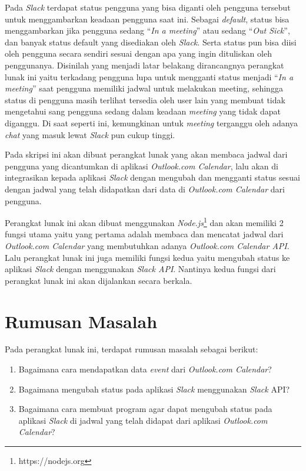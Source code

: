 Pada \textit{Slack} terdapat status pengguna yang bisa diganti oleh pengguna tersebut untuk menggambarkan keadaan pengguna saat ini. Sebagai \textit{default}, status bisa menggambarkan jika pengguna sedang ``\textit{In a meeting}'' atau sedang ``\textit{Out Sick}'', dan banyak status default yang disediakan oleh \textit{Slack}. Serta status pun bisa diisi oleh pengguna secara sendiri sesuai dengan apa yang ingin dituliskan oleh penggunanya. Disinilah yang menjadi latar belakang dirancangnya perangkat lunak ini yaitu terkadang pengguna lupa untuk mengganti status menjadi ``\textit{In a meeting}'' saat pengguna memiliki jadwal untuk melakukan meeting, sehingga status di pengguna masih terlihat tersedia oleh user lain yang membuat tidak mengetahui sang pengguna sedang dalam keadaan \textit{meeting} yang tidak dapat diganggu. Di saat seperti ini, kemungkinan untuk \textit{meeting} terganggu oleh adanya \textit{chat} yang masuk lewat \textit{Slack} pun cukup tinggi. 

Pada skripsi ini akan dibuat perangkat lunak yang akan membaca jadwal dari pengguna yang dicantumkan di aplikasi \textit{Outlook.com Calendar}, lalu akan di integrasikan kepada aplikasi \textit{Slack} dengan mengubah dan mengganti status sesuai dengan jadwal yang telah didapatkan dari data di \textit{Outlook.com Calendar} dari pengguna. 

Perangkat lunak ini akan dibuat menggunakan \textit{Node.js}\footnote{https://nodejs.org} dan akan memiliki 2 fungsi utama yaitu yang pertama adalah membaca dan mencatat jadwal dari \textit{Outlook.com Calendar} yang membutuhkan adanya \textit{Outlook.com Calendar API}. Lalu perangkat lunak ini juga memiliki fungsi kedua yaitu mengubah status ke aplikasi \textit{Slack} dengan menggunakan \textit{Slack API}. Nantinya kedua fungsi dari perangkat lunak ini akan dijalankan secara berkala. 

\section{Rumusan Masalah}
\label{sec:rumusan}
Pada perangkat lunak ini, terdapat rumusan masalah sebagai berikut:
\begin{enumerate}
	\item Bagaimana cara mendapatkan data \textit{event} dari \textit{Outlook.com Calendar}?
	\item Bagaimana mengubah status pada aplikasi \textit{Slack} menggunakan \textit{Slack} API?  
	\item Bagaimana cara membuat program agar dapat mengubah status pada aplikasi \textit{Slack} di jadwal yang telah didapat dari aplikasi \textit{Outlook.com Calendar}? 
	
\end{enumerate}

